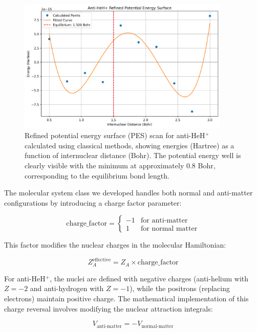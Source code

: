 \documentclass[10pt,twocolumn,a4paper]{article}
\begin{document}
\begin{figure}[t!]
    \centering
    \includegraphics[width=0.90\textwidth]{graphs/anti_heh_refined_pes.png}
    \caption{Refined potential energy surface (PES) scan for anti-HeH$^+$ calculated using classical methods, showing energies (Hartree) as a function of internuclear distance (Bohr). The potential energy well is clearly visible with the minimum at approximately 0.8 Bohr, corresponding to the equilibrium bond length.}
    \label{fig:refined_pes}
\end{figure}

The molecular system class we developed handles both normal and anti-matter configurations by introducing a charge factor parameter:

\begin{equation}
\text{charge\_factor} = 
\begin{cases} 
-1 & \text{for anti-matter} \\ 
1 & \text{for normal matter} 
\end{cases}
\end{equation}

This factor modifies the nuclear charges in the molecular Hamiltonian:

\begin{equation}
Z_A^{\text{effective}} = Z_A \times \text{charge\_factor}
\end{equation}

For anti-HeH$^+$, the nuclei are defined with negative charges (anti-helium with $Z = -2$ and anti-hydrogen with $Z = -1$), while the positrons (replacing electrons) maintain positive charge. The mathematical implementation of this charge reversal involves modifying the nuclear attraction integrals:

\begin{equation}
V_{\text{anti-matter}} = -V_{\text{normal-matter}}
\end{equation}
\end{document}
